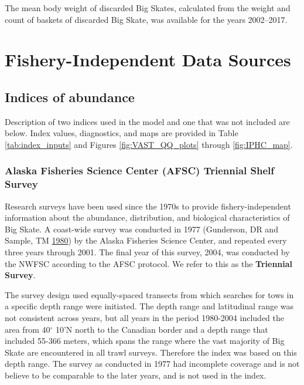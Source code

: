\documentclass[12pt,]{article}
\begin{document}
The mean body weight of discarded Big Skates, calculated from the weight
and count of baskets of discarded Big Skate, was available for the years
2002--2017.

\hypertarget{fishery-independent-data-sources}{%
\section{Fishery-Independent Data
Sources}\label{fishery-independent-data-sources}}

\hypertarget{indices-of-abundance}{%
\subsection{Indices of abundance}\label{indices-of-abundance}}

Description of two indices used in the model and one that was not
included are below. Index values, diagnostics, and maps are provided in
Table \ref{tab:index_inputs} and Figures \ref{fig:VAST_QQ_plots} through
\ref{fig:IPHC_map}.

\hypertarget{alaska-fisheries-science-center-afsc-triennial-shelf-survey}{%
\subsubsection{Alaska Fisheries Science Center (AFSC) Triennial Shelf
Survey}\label{alaska-fisheries-science-center-afsc-triennial-shelf-survey}}

Research surveys have been used since the 1970s to provide
fishery-independent information about the abundance, distribution, and
biological characteristics of Big Skate. A coast-wide survey was
conducted in 1977 (Gunderson, DR and Sample, TM
\protect\hyperlink{ref-Gunderson1980}{1980}) by the Alaska Fisheries
Science Center, and repeated every three years through 2001. The final
year of this survey, 2004, was conducted by the NWFSC according to the
AFSC protocol. We refer to this as the \textbf{Triennial Survey}.

The survey design used equally-spaced transects from which searches for
tows in a specific depth range were initiated. The depth range and
latitudinal range was not consistent across years, but all years in the
period 1980-2004 included the area from 40\(^\circ\) 10'N north to the
Canadian border and a depth range that included 55-366 meters, which
spans the range where the vast majority of Big Skate are encountered in
all trawl surveys. Therefore the index was based on this depth range.
The survey as conducted in 1977 had incomplete coverage and is not
believe to be comparable to the later years, and is not used in the
index.
\end{document}
